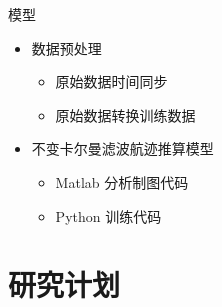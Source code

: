 \documentclass{beamer} %
\begin{document}
\begin{frame}{模型}
    \begin{itemize}
        \item 数据预处理
        \begin{itemize}
            \item 原始数据时间同步
            \item 原始数据转换训练数据
        \end{itemize}

        \item 不变卡尔曼滤波航迹推算模型
        \begin{itemize}
            \item Matlab 分析制图代码
            \item Python 训练代码
        \end{itemize}
    \end{itemize}
\end{frame}

\section{研究计划}
\end{document}
